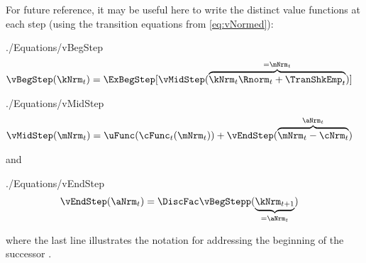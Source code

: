 \documentclass[titlepage, headings=optiontotocandhead]{\econtex}
\begin{document}
% 
For future reference, it may be useful here to write the distinct value functions at each step (using the transition equations from \eqref{eq:vNormed}):
\begin{verbatimwrite}{./Equations/vBegStep}
  \begin{equation}\begin{gathered}\begin{aligned}
\vBegStep(\kNrm_{\stge}) & = \ExBegStep[\vMidStep(\overbrace{\kNrm_{\stge} \Rnorm_{\stge} + \TranShkEmp_{\stge}}^{=\mNrm_{\stge}})]  \label{eq:vBegStep}
      \end{aligned}\end{gathered}\end{equation}
\end{verbatimwrite}
\unskip
\begin{verbatimwrite}{./Equations/vMidStep}
  \begin{equation}\begin{gathered}\begin{aligned}
\vMidStep(\mNrm_{\stge}) & = \uFunc(\cFunc_{\stge}(\mNrm_{\stge})) + \vEndStep(\overbrace{\mNrm_{\stge}-\cNrm_{\stge}}^{\aNrm_{\stge}}) \label{eq:vMidStep}
      \end{aligned}\end{gathered}\end{equation}
\end{verbatimwrite}
\unskip
and
\begin{verbatimwrite}{./Equations/vEndStep}
  \begin{equation}\begin{gathered}\begin{aligned}
\vEndStep(\aNrm_{\stge}) & = \DiscFac \vBegStepp(\underbrace{\kNrm_{\stge+1}}_{=\aNrm_{\stge}}) \label{eq:vEndStep}
      \end{aligned}\end{gathered}\end{equation}
\end{verbatimwrite}
\unskip
where the last line illustrates the notation for addressing the beginning {\move} of the successor {\interval}.
\end{document}
